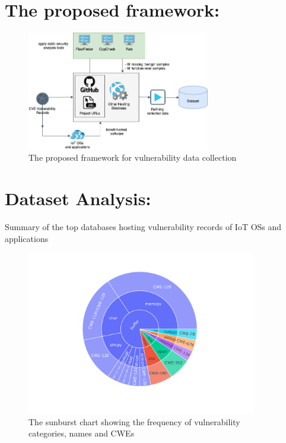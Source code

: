 \documentclass[sigconf,screen,balance,natbib=false,timestamp=false,urlbreakonhyphens=true]{acmart}
\begin{document}
\section{The proposed framework:}

\begin{figure}[h!]
  \centering
  \includegraphics[width=8cm]{../figure/framework.jpg}
  \vspace*{-1.5ex}
  \caption{The proposed framework for vulnerability data collection}
  \label{fig:lcurve-iot}
\end{figure}


\section{Dataset Analysis:}

\begin{table}[!t]
  \centering
  {\csvlinetotablerow}
  \caption{Summary of the top databases hosting vulnerability records of IoT OSs and applications}
  \label{tab:software}
\end{table}


\begin{figure}[h!]
  \centering
  \includegraphics[width=10cm]{../figure/vul_sunburst.pdf}
  \vspace*{-1.5ex}
  \caption{The sunburst chart showing the frequency of vulnerability categories, names and CWEs}
  \label{fig:lcurve-iot}
\end{figure}
\end{document}
